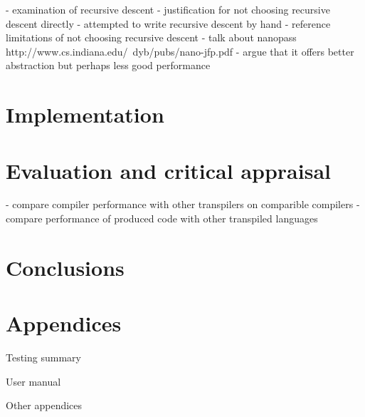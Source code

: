 \documentclass{article}
\begin{document}
- examination of recursive descent 
- justification for not choosing recursive descent directly
    - attempted to write recursive descent by hand
- reference limitations of not choosing recursive descent
- talk about nanopass
 http://www.cs.indiana.edu/~dyb/pubs/nano-jfp.pdf
- argue that it offers better abstraction but perhaps less good performance

\section{Implementation}
 
\section{Evaluation and critical appraisal}


- compare compiler performance with other transpilers on comparible compilers
- compare performance of produced code with other transpiled languages

\section{Conclusions}

\section{Appendices}

Testing summary

User manual
 

Other appendices
\end{document}
